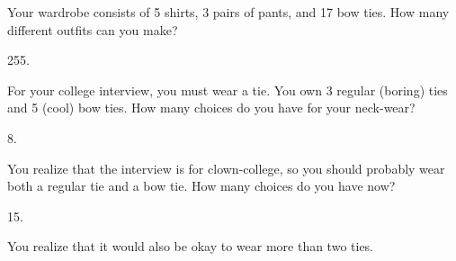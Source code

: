 
\begin{questions}

  
\question Your wardrobe consists of 5 shirts, 3 pairs of pants, and 17 bow ties.  How many different outfits can you make?

  \begin{answer}
    255.
  \end{answer}


  
\question For your college interview, you must wear a tie.  You own 3 regular (boring) ties and 5 (cool) bow ties.  How many choices do you have for your neck-wear? 

  \begin{answer}
    8.
  \end{answer}




\question You realize that the interview is for clown-college, so you should probably wear both a regular tie and a bow tie.  How many choices do you have now?

  \begin{answer}
    15.
  \end{answer}



\question You realize that it would also be okay to wear more than two ties.


\end{questions}
